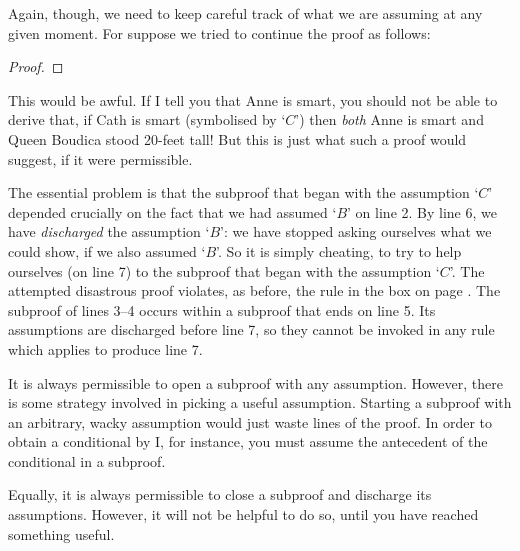 Again, though, we need to keep careful track of what we are assuming at any given moment. For suppose we tried to continue the proof as follows:
\begin{proof}
\open
	\open
	\close
\close
{}
\end{proof}
This would be awful. If I tell you that Anne is smart, you should not be able to derive that, if Cath is smart (symbolised by `$C$') then \emph{both} Anne is smart and Queen Boudica stood 20-feet tall! But this is just what such a proof would suggest, if it were permissible.

The essential problem is that the subproof that began with the assumption `$C$' depended crucially on the fact that we had assumed `$B$' on line 2. By line 6, we have \emph{discharged} the assumption `$B$': we have stopped asking ourselves what we could show, if we also assumed `$B$'. So it is simply cheating, to try to help ourselves (on line 7) to the subproof that began with the assumption `$C$'. The attempted disastrous proof violates, as before, the rule in the box on page \pageref{subproof.rule}. The subproof of lines 3–4 occurs within a subproof that ends on line 5. Its assumptions are discharged before line 7, so they cannot be invoked in any rule which applies to produce line 7.

It is always permissible to open a subproof with any assumption. However, there is some strategy involved in picking a useful assumption. Starting a subproof with an arbitrary, wacky assumption would just waste lines of the proof. In order to obtain a conditional by {\eif}I, for instance, you must assume the antecedent of the conditional in a subproof. 

Equally, it is always permissible to close a subproof and discharge its assumptions. However, it will not be helpful to do so, until you have reached something useful.

